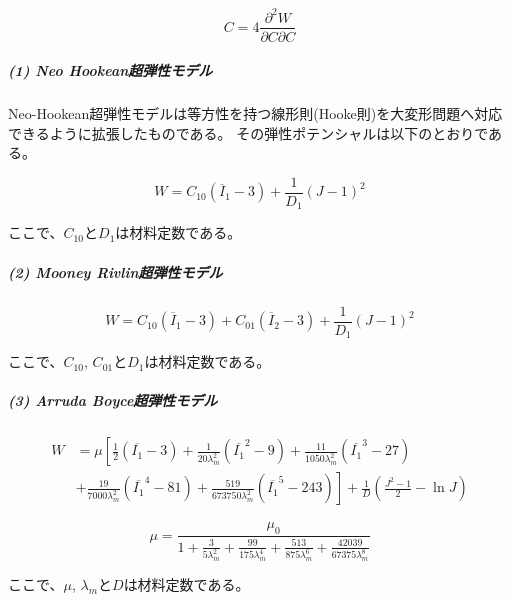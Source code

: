 \documentclass[a4paper,pandoc,ja=standard]{bxjsarticle}
\let\oldsubparagraph\subparagraph
\renewcommand{\subparagraph}[1]{\oldsubparagraph{#1}\mbox{}}
\begin{document}
\begin{equation}
C = 4 \frac{ \partial^2 W}{\partial C \partial C}
\label{eq:2.2.34}
\end{equation}

\hypertarget{neo-hookeanux8d85ux5f3eux6027ux30e2ux30c7ux30eb}{%
\subparagraph{(1) Neo Hookean超弾性モデル}\label{neo-hookeanux8d85ux5f3eux6027ux30e2ux30c7ux30eb}}

Neo-Hookean超弾性モデルは等方性を持つ線形則(Hooke則)を大変形問題へ対応できるように拡張したものである。
その弾性ポテンシャルは以下のとおりである。

\begin{equation}
W = C_{10} ( {\overline I_{1}} - 3 ) + \frac{1}{D_1} ( J - 1 )^2
\label{eq:2.2.35}
\end{equation}

ここで、\(C_{10}\)と\(D_1\)は材料定数である。

\hypertarget{mooney-rivlinux8d85ux5f3eux6027ux30e2ux30c7ux30eb}{%
\subparagraph{(2) Mooney Rivlin超弾性モデル}\label{mooney-rivlinux8d85ux5f3eux6027ux30e2ux30c7ux30eb}}

\begin{equation}
W = C_{10} ( \overline{I}_1 - 3 ) + C_{01} ( \overline{I}_2 - 3 ) + \frac{1}{D_1} ( J - 1 )^2
\label{eq:2.2.36}
\end{equation}

ここで、\(C_{10}\), \(C_{01}\)と\(D_1\)は材料定数である。

\hypertarget{arruda-boyceux8d85ux5f3eux6027ux30e2ux30c7ux30eb}{%
\subparagraph{(3) Arruda Boyce超弾性モデル}\label{arruda-boyceux8d85ux5f3eux6027ux30e2ux30c7ux30eb}}

\begin{align}
W&=\mu
  \left[
    \frac{1}{2}(\overline{I_1}-3) 
    + \frac{1}{20\lambda_m^2}(\overline{I_1}^2-9) \nonumber
    + \frac{11}{1050\lambda_m^2}(\overline{I_1}^3-27) \right. \\
    & \left. + \frac{19}{7000\lambda_m^2}(\overline{I_1}^4-81)
    + \frac{519}{673750\lambda_m^2}(\overline{I_1}^5-243)
  \right ]
  + \frac{1}{D} \left(\frac{J^2-1}{2}-\ln J\right)
\label{eq:2.2.37}
\end{align}

\begin{equation}
\mu = \frac{\mu_0}{1 + \frac{3}{5 \lambda_m^2} + \frac{99}{175 \lambda_m^4} + \frac{513}{875 \lambda_m^6} + \frac{42039}{67375 \lambda_m^8}}
\label{eq:2.2.38}
\end{equation}

ここで、\(\mu\), \(\lambda_m\)と\(D\)は材料定数である。
\end{document}
